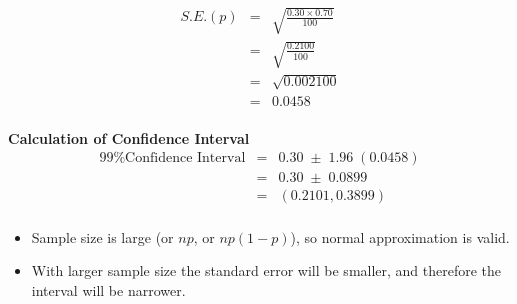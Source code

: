 \documentclass[a4paper,12pt]{article}
\begin{document}
\begin{eqnarray*} S.E.(p) &=& \sqrt{ \frac{0.30 \times 0.70 }{100}  }\\
&=& \sqrt{ \frac{0.2100 }{100}  }\\
&=& \sqrt{ 0.002100 }\\
&=& 0.0458 \\
\end{eqnarray*}
\medskip

\noindent \textbf{Calculation of Confidence Interval}
\begin{eqnarray*}
\mbox{99\% Confidence Interval} &=& 0.30 \;\pm\; 1.96\;(0.0458)\\
&=& 0.30 \;\pm\; 0.0899 \\
&=& (0.2101, 0.3899)\\
\end{eqnarray*}


\begin{itemize}
    \item Sample size is large (or $np$, or $np(1-p)$), so normal approximation is valid.
\item With larger sample size the standard error will be smaller, and therefore the
interval will be narrower.
\end{itemize}
\end{document}
